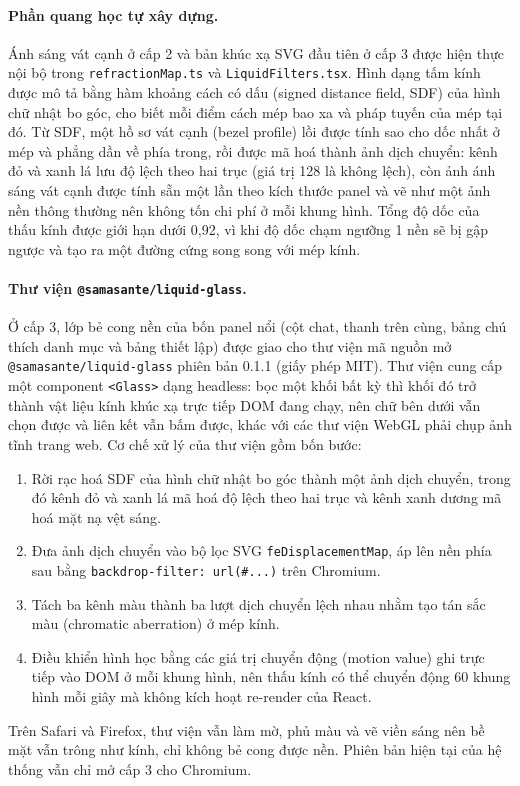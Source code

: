 \paragraph{Phần quang học tự xây dựng.} Ánh sáng vát cạnh ở cấp 2 và bản khúc xạ SVG đầu tiên ở cấp 3 được hiện thực nội bộ trong \texttt{refractionMap.ts} và \texttt{LiquidFilters.tsx}. Hình dạng tấm kính được mô tả bằng hàm khoảng cách có dấu (signed distance field, SDF) của hình chữ nhật bo góc, cho biết mỗi điểm cách mép bao xa và pháp tuyến của mép tại đó. Từ SDF, một hồ sơ vát cạnh (bezel profile) lồi được tính sao cho dốc nhất ở mép và phẳng dần về phía trong, rồi được mã hoá thành ảnh dịch chuyển: kênh đỏ và xanh lá lưu độ lệch theo hai trục (giá trị 128 là không lệch), còn ảnh ánh sáng vát cạnh được tính sẵn một lần theo kích thước panel và vẽ như một ảnh nền thông thường nên không tốn chi phí ở mỗi khung hình. Tổng độ dốc của thấu kính được giới hạn dưới 0,92, vì khi độ dốc chạm ngưỡng 1 nền sẽ bị gập ngược và tạo ra một đường cứng song song với mép kính.

\paragraph{Thư viện \texttt{@samasante/liquid-glass}.} Ở cấp 3, lớp bẻ cong nền của bốn panel nổi (cột chat, thanh trên cùng, bảng chú thích danh mục và bảng thiết lập) được giao cho thư viện mã nguồn mở \texttt{@samasante/liquid-glass} phiên bản 0.1.1 (giấy phép MIT). Thư viện cung cấp một component \texttt{<Glass>} dạng headless: bọc một khối bất kỳ thì khối đó trở thành vật liệu kính khúc xạ trực tiếp DOM đang chạy, nên chữ bên dưới vẫn chọn được và liên kết vẫn bấm được, khác với các thư viện WebGL phải chụp ảnh tĩnh trang web. Cơ chế xử lý của thư viện gồm bốn bước:
\begin{enumerate}
    \item Rời rạc hoá SDF của hình chữ nhật bo góc thành một ảnh dịch chuyển, trong đó kênh đỏ và xanh lá mã hoá độ lệch theo hai trục và kênh xanh dương mã hoá mặt nạ vệt sáng.
    \item Đưa ảnh dịch chuyển vào bộ lọc SVG \texttt{feDisplacementMap}, áp lên nền phía sau bằng \texttt{backdrop-filter: url(\#...)} trên Chromium.
    \item Tách ba kênh màu thành ba lượt dịch chuyển lệch nhau nhằm tạo tán sắc màu (chromatic aberration) ở mép kính.
    \item Điều khiển hình học bằng các giá trị chuyển động (motion value) ghi trực tiếp vào DOM ở mỗi khung hình, nên thấu kính có thể chuyển động 60 khung hình mỗi giây mà không kích hoạt re-render của React.
\end{enumerate}
Trên Safari và Firefox, thư viện vẫn làm mờ, phủ màu và vẽ viền sáng nên bề mặt vẫn trông như kính, chỉ không bẻ cong được nền. Phiên bản hiện tại của hệ thống vẫn chỉ mở cấp 3 cho Chromium.

